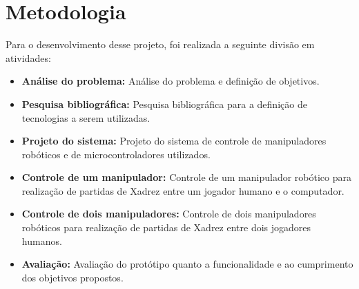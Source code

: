 \chapter[Metodologia]{Metodologia}
\label{cap:metodologia}

Para o desenvolvimento desse projeto, foi realizada a seguinte divisão em atividades:

\begin{itemize}
    \item \textbf{Análise do problema:} Análise do problema e definição de objetivos.
    \item \textbf{Pesquisa bibliográfica:} Pesquisa bibliográfica para a definição de tecnologias a serem utilizadas.
    \item \textbf{Projeto do sistema:} Projeto do sistema de controle de manipuladores robóticos e de microcontroladores utilizados.
    \item \textbf{Controle de um manipulador:} Controle de um manipulador robótico para realização de partidas de Xadrez entre um jogador humano e o computador.
    \item \textbf{Controle de dois manipuladores:} Controle de dois manipuladores robóticos para realização de partidas de Xadrez entre dois jogadores humanos.
    \item \textbf{Avaliação:} Avaliação do protótipo quanto a funcionalidade e ao cumprimento dos objetivos propostos.
\end{itemize}